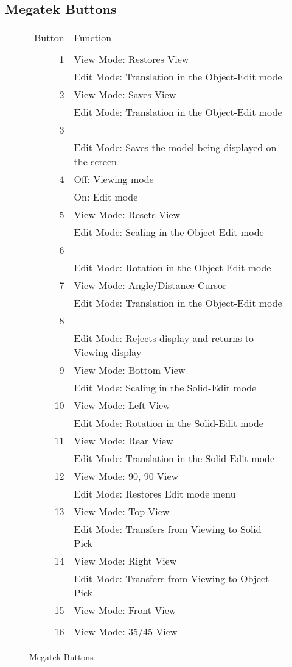 \subsection{Megatek Buttons}

\begin{figure}[tbp]
\begin{tabular}{rl}
Button  & Function\\
 \\
1       & View Mode:  Restores View \\
        & Edit Mode:  Translation in the Object-Edit mode \\
2       & View Mode:  Saves View \\
        & Edit Mode:  Translation in the Object-Edit mode \\
3 \\
        & Edit Mode:  Saves the model being displayed on the screen \\
4       & Off:        Viewing mode \\
        & On:         Edit mode \\
5       & View Mode:  Resets View \\
        & Edit Mode:  Scaling in the Object-Edit mode \\
6 \\
        & Edit Mode:  Rotation in the Object-Edit mode \\
7       & View Mode:  Angle/Distance Cursor \\
        & Edit Mode:  Translation in the Object-Edit mode \\
8 \\
        & Edit Mode:  Rejects display and returns to Viewing display \\
9       & View Mode:  Bottom View \\
        & Edit Mode:  Scaling in the Solid-Edit mode \\
10      & View Mode:  Left View \\
        & Edit Mode:  Rotation in the Solid-Edit mode \\
11      & View Mode:  Rear View \\
        & Edit Mode:  Translation in the Solid-Edit mode \\
12      & View Mode:  90, 90 View \\
        & Edit Mode:  Restores Edit mode menu \\
13      & View Mode:  Top View \\
        & Edit Mode:  Transfers from Viewing to Solid Pick \\
14      & View Mode:  Right View \\
        & Edit Mode:  Transfers from Viewing to Object Pick \\
15      & View Mode:  Front View \\
 \\
16      & View Mode:  35/45 View
\end{tabular}
\caption{Megatek Buttons \label{mg-button-table} }
\end{figure}

